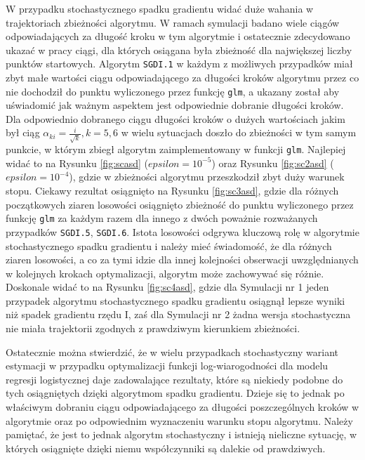 W przypadku stochastycznego spadku gradientu widać duże wahania w trajektoriach zbieżności algorytmu. W ramach symulacji badano wiele ciągów odpowiadających za długość kroku w tym algorytmie i ostatecznie zdecydowano ukazać w pracy ciągi, dla których osiągana była zbieżność dla największej liczby punktów startowych. Algorytm \texttt{SGDI.1} w każdym z możliwych przypadków miał zbyt małe wartości ciągu odpowiadającego za długości kroków algorytmu przez co nie dochodził do punktu wyliczonego przez funkcję \texttt{glm}, a ukazany został aby uświadomić jak ważnym aspektem jest odpowiednie dobranie długości kroków. Dla odpowiednio dobranego ciągu długości kroków o dużych wartościach jakim był ciąg $\alpha_{ki} = \frac{i}{\sqrt{k}}, k = 5, 6$ w wielu sytuacjach doszło do zbieżności w tym samym punkcie, w którym zbiegł algorytm zaimplementowany w funkcji \texttt{glm}. Najlepiej widać to na Rysunku \ref{fig:scasd} ($epsilon = 10^{-5}$) oraz Rysunku \ref{fig:sc2asd} ($epsilon = 10^{-4}$), gdzie w zbieżności algorytmu przeszkodził zbyt duży warunek stopu. Ciekawy rezultat osiągnięto na Rysunku \ref{fig:sc3asd}, gdzie dla różnych początkowych ziaren losowości osiągnięto zbieżność do punktu wyliczonego przez funkcję \texttt{glm} za każdym razem dla innego z dwóch poważnie rozważanych przypadków \texttt{SGDI.5}, \texttt{SGDI.6}. Istota losowości odgrywa kluczową rolę w algorytmie stochastycznego spadku gradientu i należy mieć świadomość, że dla różnych ziaren losowości, a co za tymi idzie dla innej kolejności obserwacji uwzględnianych w kolejnych krokach optymalizacji, algorytm może zachowywać się różnie. Doskonale widać to na Rysunku \ref{fig:sc4asd}, gdzie dla Symulacji nr 1 jeden przypadek algorytmu stochastycznego spadku gradientu osiągnął lepsze wyniki niż spadek gradientu rzędu I, zaś dla Symulacji nr 2 żadna wersja stochastyczna nie miała trajektorii zgodnych z prawdziwym kierunkiem zbieżności.

Ostatecznie można stwierdzić, że w wielu przypadkach stochastyczny wariant estymacji w przypadku optymalizacji funkcji log-wiarogodności dla modelu regresji logistycznej daje zadowalające rezultaty, które są niekiedy podobne do tych osiągniętych dzięki algorytmom spadku gradientu. Dzieje się to jednak po właściwym dobraniu ciągu odpowiadającego za długości poszczególnych kroków w algorytmie oraz po odpowiednim wyznaczeniu warunku stopu algorytmu. Należy pamiętać, że jest to jednak algorytm stochastyczny i istnieją nieliczne sytuację, w których osiągnięte dzięki niemu współczynniki są dalekie od prawdziwych.




